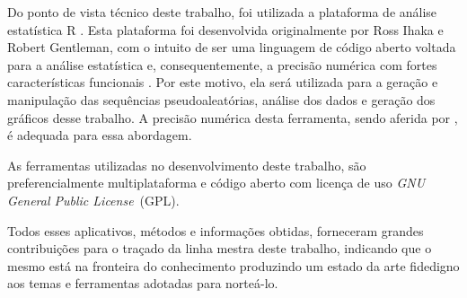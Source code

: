   Do ponto de vista técnico deste trabalho, foi utilizada a plataforma de análise estatística R . Esta plataforma foi desenvolvida originalmente por Ross Ihaka e Robert Gentleman, com o intuito de ser uma linguagem de código aberto voltada para a análise estatística e, consequentemente, a precisão numérica com fortes características funcionais \citep{Rmanual}. Por este motivo, ela será utilizada para a geração e manipulação das sequências pseudoaleatórias, análise dos dados e geração dos gráficos desse trabalho. A precisão numérica desta ferramenta, sendo aferida por \citet{Almiron:09}, é adequada para essa abordagem.

  As ferramentas utilizadas no desenvolvimento deste trabalho, são preferencialmente multiplataforma e código aberto com licença de uso \emph{GNU General Public License}~(GPL).

  Todos esses aplicativos, métodos e informações obtidas, forneceram grandes contribuições para o traçado da linha mestra deste trabalho, indicando que o mesmo está na fronteira do conhecimento produzindo um estado da arte fidedigno aos temas e ferramentas adotadas para norteá-lo.

\begin{center}
\end{center}

